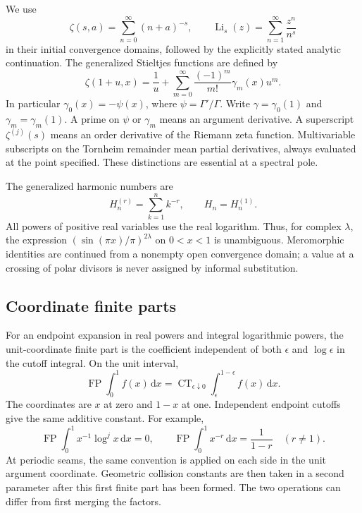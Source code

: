 \documentclass[11pt]{article}
\numberwithin{equation}{section}
\theoremstyle{definition}
\theoremstyle{remark}
\DeclareMathOperator{\FP}{FP}
\DeclareMathOperator{\CT}{CT}
\DeclareMathOperator{\Li}{Li}
\newcommand{\dd}{\,\mathrm d}
\begin{document}
We use
\[
 \zeta(s,a)=\sum_{n=0}^{\infty}(n+a)^{-s},\qquad
 \Li_s(z)=\sum_{n=1}^{\infty}\frac{z^n}{n^s}
\]
in their initial convergence domains, followed by the explicitly stated
analytic continuation. The generalized Stieltjes functions are defined by
\begin{equation}\label{scope:stieltjes}
 \zeta(1+u,x)=\frac1u+
       \sum_{m=0}^{\infty}\frac{(-1)^m}{m!}\gamma_m(x)u^m.
\end{equation}
In particular $\gamma_0(x)=-\psi(x)$, where
$\psi=\Gamma'/\Gamma$. Write $\gamma=\gamma_0(1)$ and
$\gamma_m=\gamma_m(1)$. A prime on $\psi$ or $\gamma_m$ means an
argument derivative. A superscript $\zeta^{(j)}(s)$ means an order
derivative of the Riemann zeta function. Multivariable subscripts on
the Tornheim remainder mean partial derivatives, always evaluated at
the point specified. These distinctions are essential at a spectral pole.

The generalized harmonic numbers are
\[
 H_n^{(r)}=\sum_{k=1}^n k^{-r},\qquad H_n=H_n^{(1)}.
\]
All powers of positive real variables use the real logarithm. Thus, for
complex $\lambda$, the expression $(\sin(\pi x)/\pi)^{2\lambda}$
on $0<x<1$ is unambiguous. Meromorphic identities are continued from
a nonempty open convergence domain; a value at a crossing of polar
divisors is never assigned by informal substitution.

\subsection{Coordinate finite parts}

For an endpoint expansion in real powers and integral logarithmic powers,
the unit-coordinate finite part is the coefficient independent of both
$\epsilon$ and $\log\epsilon$ in the cutoff integral. On the unit interval,
\begin{equation}\label{scope:FP}
 \FP\int_0^1 f(x)\dd x
   =\CT_{\epsilon\downarrow0}\int_\epsilon^{1-\epsilon}f(x)\dd x.
\end{equation}
The coordinates are $x$ at zero and $1-x$ at one. Independent endpoint
cutoffs give the same additive constant. For example,
\[
 \FP\int_0^1x^{-1}\log^j x\dd x=0,\qquad
 \FP\int_0^1x^{-r}\dd x=\frac1{1-r}\quad(r\ne1).
\]
At periodic seams, the same convention is applied on each side in the
unit argument coordinate. Geometric collision constants are then taken
in a second parameter after this first finite part has been formed.
The two operations can differ from first merging the factors.
\end{document}
